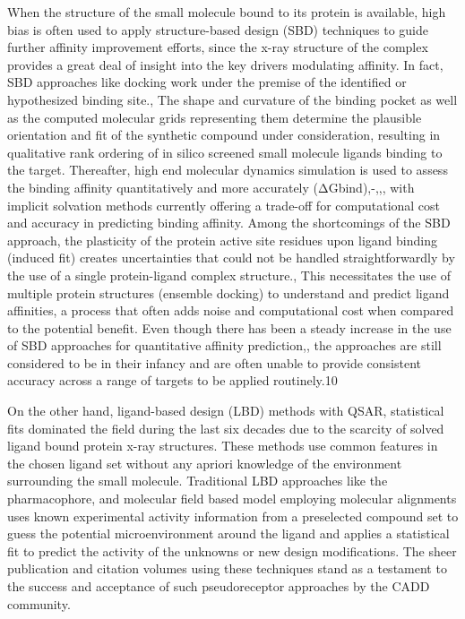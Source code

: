 When the structure of the small molecule bound to its protein is available, high bias is often used to apply structure-based design (SBD) techniques to guide further affinity improvement efforts, since the x-ray structure of the complex provides a great deal of insight into the key drivers modulating affinity.  In fact, SBD approaches like docking work under the premise of the identified or hypothesized binding site.,  The shape and curvature of the binding pocket as well as the computed molecular grids representing them determine the plausible orientation and fit of the synthetic compound under consideration, resulting in qualitative rank ordering of in silico screened small molecule ligands binding to the target.  Thereafter, high end molecular dynamics simulation is used to assess the binding affinity quantitatively and more accurately (ΔGbind),-,,, with implicit solvation methods currently offering a trade-off for computational cost and accuracy in predicting binding affinity.  Among the shortcomings of the SBD approach, the plasticity of the protein active site residues upon ligand binding (induced fit) creates uncertainties that could not be handled straightforwardly by the use of a single protein-ligand complex structure.,  This necessitates the use of multiple protein structures (ensemble docking) to understand and predict ligand affinities, a process that often adds noise and computational cost when compared to the potential benefit.  Even though there has been a steady increase in the use of SBD approaches for quantitative affinity prediction,, the approaches are still considered to be in their infancy and are often unable to provide consistent accuracy across a range of targets to be applied routinely.10  

On the other hand, ligand-based design (LBD) methods with QSAR, statistical fits dominated the field during the last six decades due to the scarcity of solved ligand bound protein x-ray structures.  These methods use common features in the chosen ligand set without any apriori knowledge of the environment surrounding the small molecule.  Traditional LBD approaches like the pharmacophore, and molecular field based model employing molecular alignments uses known experimental activity information from a preselected compound set to guess the potential microenvironment around the ligand and applies a statistical fit to predict the activity of the unknowns or new design modifications.  The sheer publication and citation volumes using these techniques stand as a testament to the success and acceptance of such pseudoreceptor approaches by the CADD community.  

